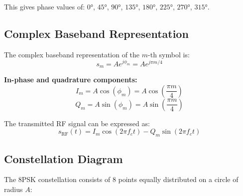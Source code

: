 This gives phase values of: $0°$, $45°$, $90°$, $135°$, $180°$, $225°$, $270°$, $315°$.

\subsection{Complex Baseband Representation}

The complex baseband representation of the $m$-th symbol is:
\begin{equation}
s_m = A e^{j\phi_m} = A e^{j\pi m/4}
\end{equation}

\textbf{In-phase and quadrature components:}
\begin{equation}
I_m = A\cos(\phi_m) = A\cos\left(\frac{\pi m}{4}\right)
\end{equation}
\begin{equation}
Q_m = A\sin(\phi_m) = A\sin\left(\frac{\pi m}{4}\right)
\end{equation}

The transmitted RF signal can be expressed as:
\begin{equation}
s_{\mathrm{RF}}(t) = I_m\cos(2\pi f_c t) - Q_m\sin(2\pi f_c t)
\end{equation}

\subsection{Constellation Diagram}

The 8PSK constellation consists of 8 points equally distributed on a circle of radius $A$:

